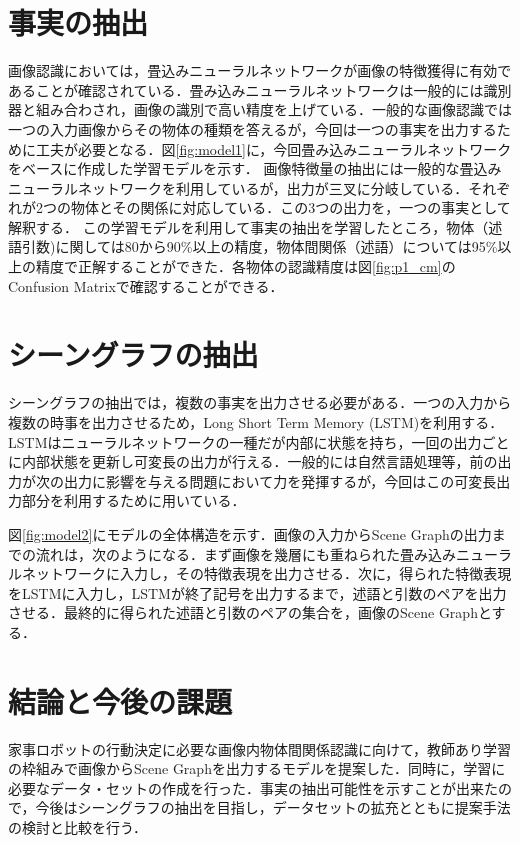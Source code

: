 
\section{事実の抽出}
画像認識においては，畳込みニューラルネットワークが画像の特徴獲得に有効であることが確認されている．畳み込みニューラルネットワークは一般的には識別器と組み合わされ，画像の識別で高い精度を上げている．一般的な画像認識では一つの入力画像からその物体の種類を答えるが，今回は一つの事実を出力するために工夫が必要となる．図\ref{fig:model1}に，今回畳み込みニューラルネットワークをベースに作成した学習モデルを示す．
画像特徴量の抽出には一般的な畳込みニューラルネットワークを利用しているが，出力が三叉に分岐している．それぞれが2つの物体とその関係に対応している．この3つの出力を，一つの事実として解釈する．
この学習モデルを利用して事実の抽出を学習したところ，物体（述語引数)に関しては80から90\%以上の精度，物体間関係（述語）については95\%以上の精度で正解することができた．各物体の認識精度は図\ref{fig:p1_cm}のConfusion Matrixで確認することができる．
\section{シーングラフの抽出}
シーングラフの抽出では，複数の事実を出力させる必要がある．一つの入力から複数の時事を出力させるため，Long Short Term Memory (LSTM)\cite{lstm}を利用する．LSTMはニューラルネットワークの一種だが内部に状態を持ち，一回の出力ごとに内部状態を更新し可変長の出力が行える．一般的には自然言語処理等，前の出力が次の出力に影響を与える問題において力を発揮するが，今回はこの可変長出力部分を利用するために用いている．

図\ref{fig:model2}にモデルの全体構造を示す．画像の入力からScene Graphの出力までの流れは，次のようになる．まず画像を幾層にも重ねられた畳み込みニューラルネットワークに入力し，その特徴表現を出力させる．次に，得られた特徴表現をLSTMに入力し，LSTMが終了記号を出力するまで，述語と引数のペアを出力させる．最終的に得られた述語と引数のペアの集合を，画像のScene Graphとする．

\section{結論と今後の課題}
家事ロボットの行動決定に必要な画像内物体間関係認識に向けて，教師あり学習の枠組みで画像からScene Graphを出力するモデルを提案した．同時に，学習に必要なデータ・セットの作成を行った．事実の抽出可能性を示すことが出来たので，今後はシーングラフの抽出を目指し，データセットの拡充とともに提案手法の検討と比較を行う．




